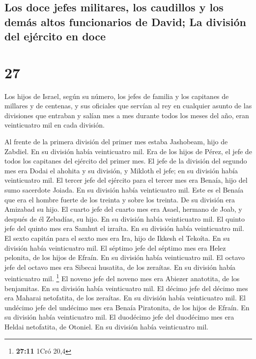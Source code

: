\hypertarget{los-doce-jefes-militares-los-caudillos-y-los-demuxe1s-altos-funcionarios-de-david-la-divisiuxf3n-del-ejuxe9rcito-en-doce}{%
\subsection{Los doce jefes militares, los caudillos y los demás altos
funcionarios de David; La división del ejército en
doce}\label{los-doce-jefes-militares-los-caudillos-y-los-demuxe1s-altos-funcionarios-de-david-la-divisiuxf3n-del-ejuxe9rcito-en-doce}}

\hypertarget{section-26}{%
\section{27}\label{section-26}}

 Los hijos de Israel, según su número, los jefes de
familia y los capitanes de millares y de centenas, y sus oficiales que
servían al rey en cualquier asunto de las divisiones que entraban y
salían mes a mes durante todos los meses del año, eran veinticuatro mil
en cada división.

 Al frente de la primera división del primer mes estaba
Jashobeam, hijo de Zabdiel. En su división había veinticuatro mil.
 Era de los hijos de Pérez, el jefe de todos los capitanes
del ejército del primer mes.  El jefe de la división del
segundo mes era Dodai el ahohita y su división, y Mikloth el jefe; en su
división había veinticuatro mil.  El tercer jefe del
ejército para el tercer mes era Benaía, hijo del sumo sacerdote Joiada.
En su división había veinticuatro mil.  Este es el Benaía
que era el hombre fuerte de los treinta y sobre los treinta. De su
división era Amizabad su hijo.  El cuarto jefe del cuarto
mes era Asael, hermano de Joab, y después de él Zebadías, su hijo. En su
división había veinticuatro mil.  El quinto jefe del
quinto mes era Samhut el izraíta. En su división había veinticuatro mil.
 El sexto capitán para el sexto mes era Ira, hijo de
Ikkesh el Tekoíta. En su división había veinticuatro mil.
 El séptimo jefe del séptimo mes era Helez pelonita, de
los hijos de Efraín. En su división había veinticuatro mil.
 El octavo jefe del octavo mes era Sibecai husatita, de
los zeraítas. En su división había veinticuatro mil. \footnote{\textbf{27:11}
  1Cró 20,4}  El noveno jefe del noveno mes era Abiezer
anatotita, de los benjamitas. En su división había veinticuatro mil.
 El décimo jefe del décimo mes era Maharai netofatita, de
los zeraítas. En su división había veinticuatro mil.  El
undécimo jefe del undécimo mes era Benaía Piratonita, de los hijos de
Efraín. En su división había veinticuatro mil.  El
duodécimo jefe del duodécimo mes era Heldai netofatita, de Otoniel. En
su división había veinticuatro mil.

